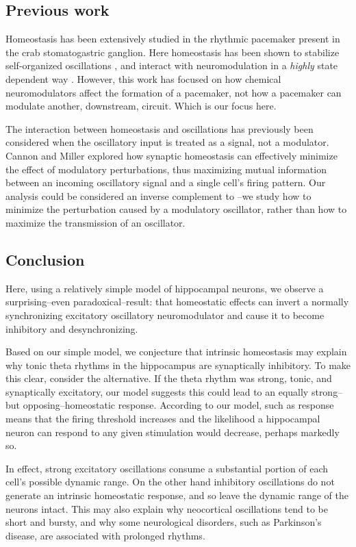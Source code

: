 \documentclass{article}
\begin{document}
\subsection*{Previous work}
Homeostasis has been extensively studied in the rhythmic pacemaker present in the crab stomatogastric ganglion. Here homeostasis has been shown to stabilize self-organized oscillations \cite{Golowasch1999}, and interact with neuromodulation in a \textit{highly} state dependent way \cite{Marder2014,Marder2015,Marder2014}. However, this work has focused on how chemical neuromodulators affect the formation of a pacemaker, not how a pacemaker can modulate another, downstream, circuit. Which is our focus here.

The interaction between homeostasis and oscillations has previously been considered when the oscillatory input is treated as a signal, not a modulator. Cannon and Miller \citep{Cannon2017} explored how synaptic homeostasis can effectively minimize the effect of modulatory perturbations, thus maximizing mutual information between an incoming oscillatory signal and a single cell's firing pattern. Our analysis could be considered an inverse complement to \citep{Cannon2017}--we study how to minimize the perturbation caused by a modulatory oscillator, rather than how to maximize the transmission of an oscillator.

\subsection*{Conclusion}
 Here, using a relatively simple model of hippocampal neurons, we observe a surprising--even paradoxical--result: that homeostatic effects can invert a normally synchronizing excitatory oscillatory neuromodulator and cause it to become inhibitory and desynchronizing.
 
 Based on our simple model, we conjecture that intrinsic homeostasis may explain why tonic theta rhythms in the hippocampus are synaptically inhibitory. To make this clear, consider the alternative. If the theta rhythm was strong, tonic, and synaptically excitatory, our model suggests this could lead to an equally strong--but opposing--homeostatic response. According to our model, such as response means that the firing threshold increases and the likelihood a hippocampal neuron can respond to any given stimulation would decrease, perhaps markedly so.

In effect, strong excitatory oscillations consume a substantial portion of each cell's possible dynamic range. On the other hand inhibitory oscillations do not generate an intrinsic homeostatic response, and so leave the dynamic range of the neurons intact. This may also explain why neocortical oscillations tend to be short and bursty, and why some neurological disorders, such as Parkinson's disease, are associated with prolonged rhythms.
\end{document}
